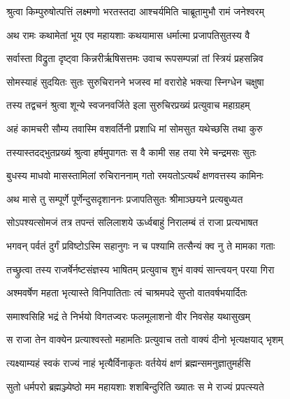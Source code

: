 
\twolineshloka
{श्रुत्वा किम्पुरुषोत्पत्तिं लक्ष्मणो भरतस्तदा}
{आश्चर्यमिति चाब्रूतामुभौ रामं जनेश्वरम्} %

\twolineshloka
{अथ रामः कथामेतां भूय एव महायशाः}
{कथयामास धर्मात्मा प्रजापतिसुतस्य वै} %

\twolineshloka
{सर्वास्ता विद्रुता दृष्ट्वा किन्नरीर्ऋषिसत्तमः}
{उवाच रूपसम्पन्नां तां स्त्रियं प्रहसन्निव} %

\twolineshloka
{सोमस्याहं सुदयितः सुतः सुरुचिरानने}
{भजस्व मां वरारोहे भक्त्या स्निग्धेन चक्षुषा} %

\twolineshloka
{तस्य तद्वचनं श्रुत्वा शून्ये स्वजनवर्जिते}
{इला सुरुचिरप्रख्यं प्रत्युवाच महाग्रहम्} %

\twolineshloka
{अहं कामचरी सौम्य तवास्मि वशवर्तिनी}
{प्रशाधि मां सोमसुत यथेच्छसि तथा कुरु} %

\twolineshloka
{तस्यास्तदद्भुतप्रख्यं श्रुत्वा हर्षमुपागतः}
{स वै कामी सह तया रेमे चन्द्रमसः सुतः} %

\twolineshloka
{बुधस्य माधवो मासस्तामिलां रुचिराननाम्}
{गतो रमयतोऽत्यर्थं क्षणवत्तस्य कामिनः} %

\twolineshloka
{अथ मासे तु सम्पूर्णे पूर्णेन्दुसदृशाननः}
{प्रजापतिसुतः श्रीमाञ्छयने प्रत्यबुध्यत} %

\twolineshloka
{सोऽपश्यत्सोमजं तत्र तपन्तं सलिलाशये}
{ऊर्ध्वबाहुं निरालम्बं तं राजा प्रत्यभाषत} %

\twolineshloka
{भगवन् पर्वतं दुर्गं प्रविष्टोऽस्मि सहानुगः}
{न च पश्यामि तत्सैन्यं क्व नु ते मामका गताः} %

\twolineshloka
{तच्छ्रुत्वा तस्य राजर्षेर्नष्टसंज्ञस्य भाषितम्}
{प्रत्युवाच शुभं वाक्यं सान्त्वयन् परया गिरा} %

\twolineshloka
{अश्मवर्षेण महता भृत्यास्ते विनिपातिताः}
{त्वं चाश्रमपदे सुप्तो वातवर्षभयार्दितः} %

\twolineshloka
{समाश्वसिहि भद्रं ते निर्भयो विगतज्वरः}
{फलमूलाशनो वीर निवसेह यथासुखम्} %

\twolineshloka
{स राजा तेन वाक्येन प्रत्याश्वस्तो महामतिः}
{प्रत्युवाच ततो वाक्यं दीनो भृत्यक्षयाद् भृशम्} %

\twolineshloka
{त्यक्ष्याम्यहं स्वकं राज्यं नाहं भृत्यैर्विनाकृतः}
{वर्तयेयं क्षणं ब्रह्मन्समनुज्ञातुमर्हसि} %

\twolineshloka
{सुतो धर्मपरो ब्रह्मञ्ज्येष्ठो मम महायशाः}
{शशबिन्दुरिति ख्यातः स मे राज्यं प्रपत्स्यते} %

